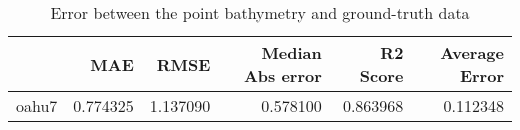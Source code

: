 \begin{table}[h!]
\caption{Error between the point bathymetry and ground-truth data}
\label{tab:oahu7_lidar_error}
\begin{tabular}{lrrrrr}
\toprule
 & MAE & RMSE & Median Abs error & R2 Score & Average Error \\
\midrule
oahu7 & 0.774325 & 1.137090 & 0.578100 & 0.863968 & 0.112348 \\
\bottomrule
\end{tabular}
\end{table}
